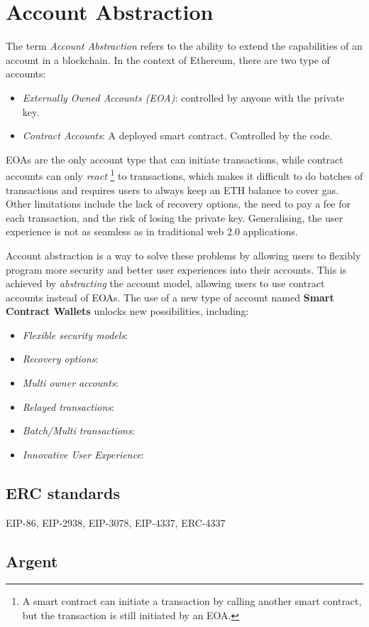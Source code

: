 \section{Account Abstraction}
\label{sec:account_abstraction}


The term \textit{Account Abstraction} refers to the ability to extend the capabilities of an account in a blockchain. In the context of Ethereum, there are two type of accounts: \cite{ethereum-accounts}

\begin{itemize}
    \item \textit{Externally Owned Accounts (EOA)}: controlled by anyone with the private key.
    \item \textit{Contract Accounts}: A deployed smart contract. Controlled by the code.
\end{itemize}


EOAs are the only account type that can initiate transactions, while contract accounts can only \textit{react} \footnote{A smart contract can initiate a transaction by calling another smart contract, but the transaction is still initiated by an EOA.} to transactions, which makes it difficult to do batches of transactions and requires users to always keep an ETH balance to cover gas. Other limitations include the lack of recovery options, the need to pay a fee for each transaction, and the risk of losing the private key. Generalising, the user experience is not as seamless as in traditional web 2.0 applications. \cite{ethereum-account-abstraction}


Account abstraction is a way to solve these problems by allowing users to flexibly program more security and better user experiences into their accounts. This is achieved by \textit{abstracting} the account model, allowing users to use contract accounts instead of EOAs. The use of a new type of account named \textbf{Smart Contract Wallets} unlocks new possibilities, including: \cite{ethereum-account-abstraction}

\begin{itemize}
    \item \textit{Flexible security models}: 
    \item \textit{Recovery options}:
    \item \textit{Multi owner accounts}:
    \item \textit{Relayed transactions}:
    \item \textit{Batch/Multi transactions}:
    \item \textit{Innovative User Experience}:
\end{itemize}


\subsection{ERC standards}
\label{subsec:erc_standards}

EIP-86, EIP-2938, EIP-3078, EIP-4337, ERC-4337

\subsection{Argent}
\label{subsec:argent}
